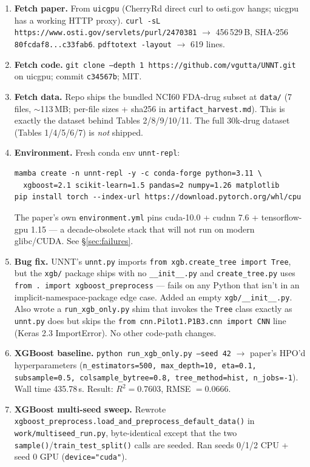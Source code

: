 \documentclass[11pt]{article}
\begin{document}
\begin{enumerate}
\item \textbf{Fetch paper.} From \texttt{uicgpu} (CherryRd direct curl to osti.gov hangs; uicgpu has a working HTTP proxy). \texttt{curl -sL https://www.osti.gov/servlets/purl/2470381} $\to$ 456\,529\,B, SHA-256 \texttt{80fcdaf8...c33fab6}. \texttt{pdftotext -layout} $\to$ 619 lines.
\item \textbf{Fetch code.} \texttt{git clone --depth 1 https://github.com/vgutta/UNNT.git} on uicgpu; commit \texttt{c34567b}; MIT.
\item \textbf{Fetch data.} Repo ships the bundled NCI60 FDA-drug subset at \texttt{data/} (7 files, $\sim$113\,MB; per-file sizes + sha256 in \texttt{artifact\_harvest.md}). This is exactly the dataset behind Tables 2/8/9/10/11. The full 30k-drug dataset (Tables 1/4/5/6/7) is \emph{not} shipped.
\item \textbf{Environment.} Fresh conda env \texttt{unnt-repl}:
\begin{lstlisting}
mamba create -n unnt-repl -y -c conda-forge python=3.11 \
  xgboost=2.1 scikit-learn=1.5 pandas=2 numpy=1.26 matplotlib
pip install torch --index-url https://download.pytorch.org/whl/cpu
\end{lstlisting}
The paper's own \texttt{environment.yml} pins cuda-10.0 + cudnn 7.6 + tensorflow-gpu 1.15 --- a decade-obsolete stack that will not run on modern glibc/CUDA. See \S\ref{sec:failures}.
\item \textbf{Bug fix.} UNNT's \texttt{unnt.py} imports \texttt{from xgb.create\_tree import Tree}, but the \texttt{xgb/} package ships with no \texttt{\_\_init\_\_.py} and \texttt{create\_tree.py} uses \texttt{from . import xgboost\_preprocess} --- fails on any Python that isn't in an implicit-namespace-package edge case. Added an empty \texttt{xgb/\_\_init\_\_.py}. Also wrote a \texttt{run\_xgb\_only.py} shim that invokes the \texttt{Tree} class exactly as \texttt{unnt.py} does but skips the \texttt{from cnn.Pilot1.P1B3.cnn import CNN} line (Keras 2.3 ImportError). No other code-path changes.
\item \textbf{XGBoost baseline.} \texttt{python run\_xgb\_only.py --seed 42} $\to$ paper's HPO'd hyperparameters (\texttt{n\_estimators=500, max\_depth=10, eta=0.1, subsample=0.5, colsample\_bytree=0.8, tree\_method=hist, n\_jobs=-1}). Wall time 435.78\,s. Result: $R^2 = 0.7603$, RMSE $= 0.0666$.
\item \textbf{XGBoost multi-seed sweep.} Rewrote \texttt{xgboost\_preprocess.load\_and\_preprocess\_default\_data()} in \texttt{work/multiseed\_run.py}, byte-identical except that the two \texttt{sample()}/\texttt{train\_test\_split()} calls are seeded. Ran seeds 0/1/2 CPU + seed 0 GPU (\texttt{device="cuda"}).

\end{enumerate}
\end{document}
